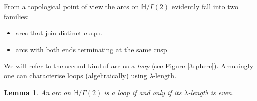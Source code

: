 \documentclass[12pt,a4paper]{amsart}
\newtheorem{lem}[thm]{Lemma}
\def\HH{\mathbb{H}}
\def\g2{\Gamma(2)}
\def\xx{\HH/\g2}
\begin{document}


	




From a topological point of view the arcs on $\xx$ evidently fall into two families:
\begin{itemize}
	\item arcs that join distinct cusps. 
	\item arcs with both ends terminating at the same cusp
\end{itemize}
We will refer to the second kind of arc as a \textit{loop}
(see Figure \ref{3sphere}).
Amusingly one can characterise loops (algebraically) using $\lambda$-length.
\begin{lem}\label{length parity}
	An arc on $\xx$ is a loop if and only if its
	$\lambda$-length is even.
\end{lem}
\end{document}
